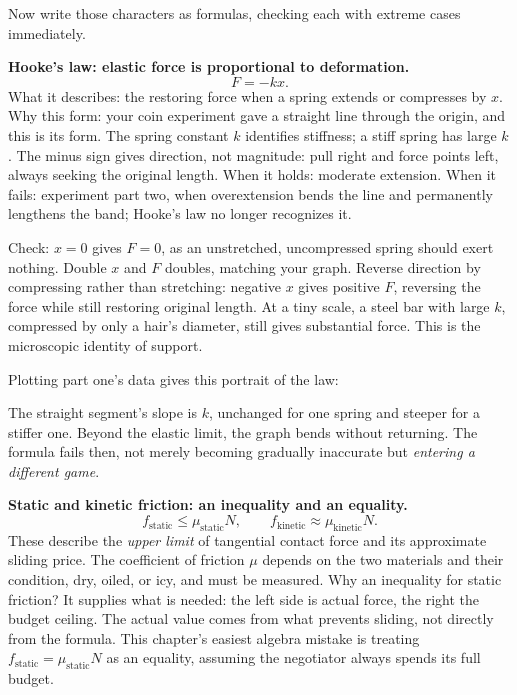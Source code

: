 
Now write those characters as formulas, checking each with extreme cases immediately.

\textbf{Hooke's law: elastic force is proportional to deformation.}
\[
F=-kx .
\]
What it describes: the restoring force when a spring extends or compresses by \(x\). Why this form: your coin experiment gave a straight line through the origin, and this is its form. The spring constant \(k\) identifies stiffness; a stiff spring has large \(k\). The minus sign gives direction, not magnitude: pull right and force points left, always seeking the original length. When it holds: moderate extension. When it fails: experiment part two, when overextension bends the line and permanently lengthens the band; Hooke's law no longer recognizes it.

Check: \(x=0\) gives \(F=0\), as an unstretched, uncompressed spring should exert nothing. Double \(x\) and \(F\) doubles, matching your graph. Reverse direction by compressing rather than stretching: negative \(x\) gives positive \(F\), reversing the force while still restoring original length. At a tiny scale, a steel bar with large \(k\), compressed by only a hair's diameter, still gives substantial force. This is the microscopic identity of support.

Plotting part one's data gives this portrait of the law:

\begin{center}
\end{center}

The straight segment's slope is \(k\), unchanged for one spring and steeper for a stiffer one. Beyond the elastic limit, the graph bends without returning. The formula fails then, not merely becoming gradually inaccurate but \emph{entering a different game}.

\textbf{Static and kinetic friction: an inequality and an equality.}
\[
f_{\text{static}}\le \mu_{\text{static}} N,\qquad f_{\text{kinetic}}\approx \mu_{\text{kinetic}} N .
\]
These describe the \emph{upper limit} of tangential contact force and its approximate sliding price. The coefficient of friction \(\mu\) depends on the two materials and their condition, dry, oiled, or icy, and must be measured. Why an inequality for static friction? It supplies what is needed: the left side is actual force, the right the budget ceiling. The actual value comes from what prevents sliding, not directly from the formula. This chapter's easiest algebra mistake is treating \(f_{\text{static}}=\mu_{\text{static}}N\) as an equality, assuming the negotiator always spends its full budget.


